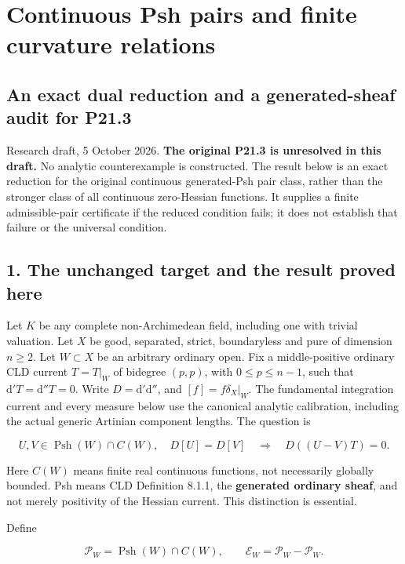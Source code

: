 \documentclass[
  11pt,
]{article}
\author{}
\date{}
\begin{document}
\section{Continuous Psh pairs and finite curvature
relations}\label{continuous-psh-pairs-and-finite-curvature-relations}

\subsection{An exact dual reduction and a generated-sheaf audit for
P21.3}\label{an-exact-dual-reduction-and-a-generated-sheaf-audit-for-p21.3}

Research draft, 5 October 2026. \textbf{The original P21.3 is unresolved
in this draft.} No analytic counterexample is constructed. The result
below is an exact reduction for the original continuous generated-Psh
pair class, rather than the stronger class of all continuous
zero-Hessian functions. It supplies a finite admissible-pair certificate
if the reduced condition fails; it does not establish that failure or
the universal condition.

\subsection{1. The unchanged target and the result proved
here}\label{the-unchanged-target-and-the-result-proved-here}

Let \(K\) be any complete non-Archimedean field, including one with
trivial valuation. Let \(X\) be good, separated, strict, boundaryless
and pure of dimension \(n\geq2\). Let \(W\subset X\) be an arbitrary
ordinary open. Fix a middle-positive ordinary CLD current \(T=T|_W\) of
bidegree \((p,p)\), with \(0\leq p\leq n-1\), such that
\(\mathrm d'T=\mathrm d''T=0\). Write \(D=\mathrm d'\mathrm d''\), and
\([f]=f\delta_X|_W\). The fundamental integration current and every
measure below use the canonical analytic calibration, including the
actual generic Artinian component lengths. The question is

\[
U,V\in\operatorname{Psh}(W)\cap C(W),\quad D[U]=D[V]
\quad\Longrightarrow\quad D((U-V)T)=0. \tag{1}
\]

Here \(C(W)\) means finite real continuous functions, not necessarily
globally bounded. Psh means CLD Definition 8.1.1, the \textbf{generated
ordinary sheaf}, and not merely positivity of the Hessian current. This
distinction is essential.

Define

\[
\mathcal P_W=\operatorname{Psh}(W)\cap C(W),\qquad
\mathcal E_W=\mathcal P_W-\mathcal P_W.
\]
\end{document}
